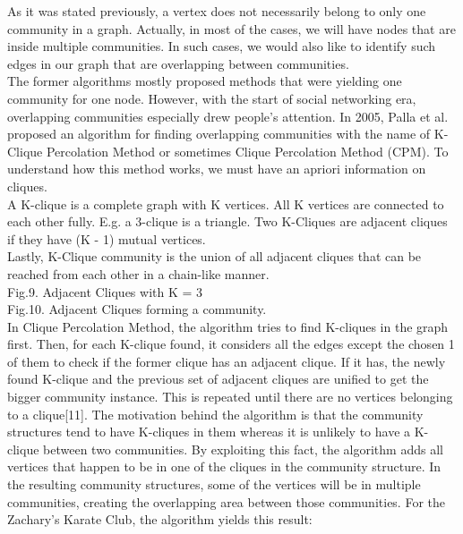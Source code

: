 \documentclass[10pt]{article}
\begin{document}
As it was stated previously, a vertex does not necessarily belong to only one community in a graph. Actually, in most of the cases, we will have nodes that are inside multiple communities. In such cases, we would also like to identify such edges in our graph that are overlapping between communities. \\

The former algorithms mostly proposed methods that were yielding one community for one node. However, with the start of social networking era, overlapping communities especially drew people’s attention. In 2005, Palla et al. proposed an algorithm for finding overlapping communities with the name of K-Clique Percolation Method or sometimes Clique Percolation Method (CPM). To understand how this method works, we must have an apriori information on cliques. \\

A K-clique is a complete graph with K vertices. All K vertices are connected to each other fully. E.g. a 3-clique is a triangle.
Two K-Cliques are adjacent cliques if they have (K - 1) mutual vertices. \\

Lastly, K-Clique community is the union of all adjacent cliques that can be reached from each other in a chain-like manner. \\

Fig.9. Adjacent Cliques with K = 3 \\

Fig.10. Adjacent Cliques forming a community. \\

In Clique Percolation Method, the algorithm tries to find K-cliques in the graph first. Then, for each K-clique found, it considers all the edges except the chosen 1 of them to check if the former clique has an adjacent clique. If it has, the newly found K-clique and the previous set of adjacent cliques are unified to get the bigger community instance. This is repeated until there are no vertices belonging to a clique[11].
The motivation behind the algorithm is that the community structures tend to have K-cliques in them whereas it is unlikely to have a K-clique between two communities. By exploiting this fact, the algorithm adds all vertices that happen to be in one of the cliques in the community structure. In the resulting community structures, some of the vertices will be in multiple communities, creating the overlapping area between those communities. For the Zachary’s Karate Club, the algorithm yields this result: \\
\end{document}
